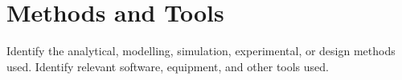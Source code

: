\section{Methods and Tools}
Identify the analytical, modelling, simulation, 
experimental, or design methods used. Identify 
relevant software, equipment, and other tools used. 